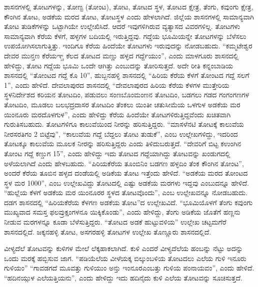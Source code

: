 ಶಾಸನಗಳಲ್ಲಿ ತೋಟಗಳನ್ನು, ತೋಣ್ಟ (ತೋಂಟ), ತೋಟ, ತೋಟದ ಸ್ಥಳ, ತೋಟದ ಕ್ಷೇತ್ರ, ತೆಂಗು, ಕವುಂಗು ಕ್ಷೇತ್ರ, ಕೌಂಗಿನ ತೋಟ, ಅಡಕೆಯ ಮರದ ತೋಟ, ತೋಟಸ್ಥಳ ಎಂದು ಹೇಳಲಾಗಿದೆ. ಜಿಲ್ಲೆಯ ಶಾಸನಗಳಲ್ಲಿ ಸಾಮಾನ್ಯವಾಗಿ ತೋಟ ತುಡಿಕೆಗಳನ್ನು ಒಟ್ಟಾಗಿಯೇ ಉಲ್ಲೇಖಿಸಿದೆ. ಆದರೆ ಇವುಗಳಿಗಿರುವ ವ್ಯತ್ಯಾಸದ ವಿವರಗಳಿಲ್ಲ. ತೋಟಗಳು ಸಾಮಾನ್ಯವಾಗಿ ಕೆರೆಯ ಕೆಳಗೆ, ಹಳ್ಳಗಳ ಬದಿಯಲ್ಲಿ ಇರುತ್ತಿದ್ದವು. ಗದ್ದೆಯ ಭೂಮಿಯನ್ನೇ ತೋಟಗಳನ್ನು ಬೆಳೆಸಲು ಉಪಯೋಗಿಸಲಾಗುತ್ತಿತ್ತು. ಇಂದಿಗೂ ಕೆರೆಯ ಹಿಂದೆಯೇ ತೋಟಗಳು ಇರುವುದನ್ನು ನೋಡಬಹುದು. “ಕಮ್ಮಟೇಶ್ವರ ದೇವರ ಮುನ್ತಣ ಕೆರೆಯಞ್ಚ ಕೆಲದ ತೋಟದ ಮಣ್ಣು ಹಳ್ಳದ ಗರ್ದ್ದೆಯುಂ”, ಎಂದು ಮಾಳಗೂರು ಶಾಸನದಲ್ಲಿ ಹೇಳಿದ್ದು, ತೋಟ ಗದ್ದೆಯ ಭೂಮಿ ಒಂದೇ ಆಗಿತ್ತು ಎಂಬುದನ್ನು ತೋರಿಸುತ್ತದೆ. ಅದೇ ರೀತಿ ಕನ್ನಂಬಾಡಿಯ ಶಾಸನದಲ್ಲಿ “ತೋಂಟದ ಗದ್ದೆ ಕೊ 10”, ಹುಬ್ಬನಹಳ್ಳಿ ಶಾಸನದಲ್ಲಿ “ಹಿರಿಯ ಕೆರೆಯ ಕೆಳಗೆ ತೋಂಟದ ಗದ್ದೆ ಸಲಗೆ 1”, ಎಂದು ಹೇಳಿದೆ. ದೇವಲಾಪುರದ ಶಾಸನದಲ್ಲಿ “ದೇವಲಾಪುರದ ಹಿರಿಯ ಕೆರೆಯ ಕೆಳಗಳ ಮುತ್ತೇರಿಯ ಸ್ಥಳನಿರ್ದೇಶದ ಕರಿಯನ ತೋಟದಿಂ, ಪಡುವಲು ಸಂಣಬೊಂಮಂಣನ ತೋಟದಿಂ, ಬಡಗಲು ಗಡದ ಗಂಗಂಗಣಗಳ ತೋಟದಿಂ, ಮೂಡಲು ಬಲಭದ್ರದಾಸರ ತೋಟದಿಂ ತೆಂಕಲು ಯಿಂತೀ ಚತುಸೀಮೆಯ ಒಳಗುಳ ಅಡಕೆಯ ಮರ ಯಿಂನೂರು ಮರದೊಳಗುಳ”, ಎಂದು ಹೇಳಿದ್ದು ಕೆರೆಯ ಹಿಂದೆಯೇ ತೋಟಗಳಿರುತ್ತಿದ್ದವೆಂದು ಖಚಿತವಾಗಿ ಗುರುತಿಸಬಹುದು. ತೋಟಗಳಿಗೂ ಕಾಲುವೆಯಿಂದ ನೀರನ್ನು ಹರಿಸುತ್ತಿದ್ದರು. “ಮಾಸಳೆನಟಿ ತೋಟಕ್ಕೆ ಕಾಲುವೆಯ ನೀರಸರತಿಗಂ 2 ಬಿಟ್ಟೆವು”, “ಕಾಲುವೆಯ ಗದ್ದೆ ಬೆದ್ದಲು ತೋಟ ತುಡುಕೆ”, ಎಂಬ ಉಲ್ಲೇಖಗಳಿದ್ದು, ಇದರಿಂದ ತೋಟಕ್ಕೂ ಕಾಲುವೆಯ ಮೂಲಕ ನೀರನ್ನು ಹರಿಸುತ್ತಿದ್ದರು ಎಂದು ತಿಳಿದುಬರುತ್ತದೆ. “ದೇವರಿಗೆ ಬಿಟ್ಟ ಕಉಂಗಿನ ತೋಂಟ ಗದ್ದೆ ಕಣ್ಡುಗ 15”, ಎಂದು ಹೇಳಿದ್ದು ಇದು ತೋಟದ ಗದ್ದೆಯಾಗಿದ್ದು ತೋಟವನ್ನು ಖಂಡುಗದಲ್ಲಿ ಅಳೆಯಲಾಗಿದೆ ಎಂದು ಹೇಳಬಹುದು. “ಪಿರಿಯಕೆರೆಯ ತೂಂಬಿನಿಂ ಬಡಗಣ ಹಳ್ಳದಿಂ ತೆಂಕ ಕೌಂಗಿನ ತೋಂಟ”, ಅಂದರೆ ಕೆರೆಯ ತೂಬಿನ ಹಳ್ಳದ ದಂಡೆಯಲ್ಲಿ ಅಡಿಕೆಯ ತೋಟ ಇತ್ತೆಂದು ಹೇಳಿದೆ. “ಅಡಕೆಯ ಮರದ ತೋಂಟದ ಸ್ಥಳ ಮರ 1000”, ಎಂಬ ಉಲ್ಲೇಖವಿದ್ದು ತೋಟದಲ್ಲಿ ಎಷ್ಟು ಅಡಕೆಯ ಮರಗಳು ಇದ್ದವು ಎಂಬುದನ್ನೂ ಹೇಳಿದೆ. “ಹುಲ್ಲೆಯ ಕೆಳಗೆ ಅಡಕೆಯ ಮರ ಯಿಂನೂರರ ಸ್ಥಳದ ತೋಟವೊಂದು”, ಎಂಬ ಉಲ್ಲೇಖವನ್ನೂ ನೋಡಬಹುದು. ದಡಗ ಶಾಸನದಲ್ಲಿ “ಹಿರಿಯಕೆರೆಯ ಕೆಳಗಣ ಅಡಕೆಯ ತೋಟ”ದ ಉಲ್ಲೇಖವಿದೆ. “ಭೂಮಿಯೊಳಗೆ ತೆಂಗು ಕವುಂಗು ಮುಖ್ಯವಾದ ಸಮಸ್ತ ಫಲವ್ರುಕ್ಷಂಗಳನೂ ಯಿಕ್ಕಿಕೊಂಡು”, ಎಂದು ಹೇಳಿದ್ದು, ತೆಂಗು ಅಡಿಕೆಯ ಜೊತೆಗೆ ಹಣ್ಣನು ನೀಡುವ ಮರಗಳನ್ನೂ ಕೂಡಾ ಬೆಳೆಸುತ್ತಿದ್ದರು. “ತೋಟದ ಅಡಕೆ ಹುಟ್ಟುವಳಿಯ” ಉಲ್ಲೇಖ ಚಟ್ಟಮಗೆರೆ ಶಾಸನದಲ್ಲಿದೆ. ಜಕ್ಕನಹಳ್ಳಿ ತೋಟ, ಅಸಗರಹಳ್ಳಿ ತೋಟಗಳ ಉಲ್ಲೇಖ ತೊಣ್ಣೂರು ಶಾಸನದಲ್ಲಿದೆ.

ವೀಳ್ಯದೆಲೆ ತೋಟವನ್ನು ಕುಳಿಗಳ ಮೇಲೆ ಲೆಕ್ಕಹಾಕಲಾಗಿದೆ. ಕುಳಿ ಎಂದರೆ ವೀಳ್ಯದೆಲೆಯ ಹಂಬನ್ನು ನೆಟ್ಟು ಅದನ್ನು ಒಂದು ಮರಕ್ಕೆ ಹಬ್ಬಿಸುವ ಜಾಗ. “ಪಡಿಯೆಲೆಯ ವೀಳೆಯಕ್ಕ ಬಿಲ್ಕುಂಬಳಿಯ ತೋಟದಲು ಎಲೆಯ ಗುಳಿ ಇನೂರು ಗುಳಿಯಂ” “ಗಾವಡಗದೆ ಮೂವತ್ತು ಗುಳಿಯುಂ ಅನ್ತು ಇಂನೂರಎಂಬತ್ತು ಗುಳಿಯ ಪಂನಾಯವಂ”, ಎಂದು ಹೇಳಿದೆ. “ಹದಿನಯ್ಗುಳ ಎಲೆಯತ್ತಿಯನು”, ಎಂದು ಹೇಳಿದ್ದು ಇದು ಹದಿನೈದು ಕುಳಿ ಎಲೆಯ ತೋಟವನ್ನು ಸೂಚಿಸುತ್ತದೆ.


